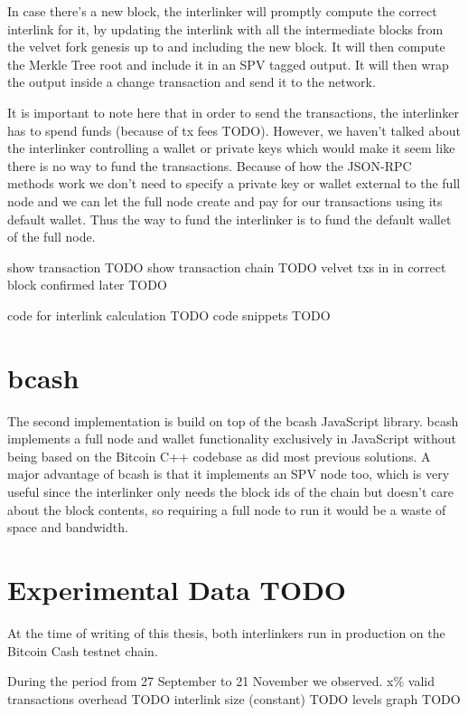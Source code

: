 In case there's a new block, the interlinker will promptly compute the correct interlink for it, by updating the interlink with all the intermediate blocks from the velvet fork genesis up to and including the new block. It will then compute the Merkle Tree root and include it in an SPV tagged output. It will then wrap the output inside a change transaction and send it to the network.

It is important to note here that in order to send the transactions, the interlinker has to spend funds (because of tx fees TODO). However, we haven't talked about the interlinker controlling a wallet or private keys which would make it seem like there is no way to fund the transactions. Because of how the JSON-RPC methods work we don't need to specify a private key or wallet external to the full node and we can let the full node create and pay for our transactions using its default wallet. Thus the way to fund the interlinker is to fund the default wallet of the full node.

show transaction TODO
show transaction chain TODO
velvet txs in in correct block confirmed later TODO

code for interlink calculation TODO
code snippets TODO

\section{bcash}
The second implementation is build on top of the bcash JavaScript library. bcash implements a full node and wallet functionality exclusively in JavaScript without being based on the Bitcoin C++ codebase as did most previous solutions. A major advantage of bcash is that it implements an SPV node too, which is very useful since the interlinker only needs the block ids of the chain but doesn't care about the block contents, so requiring a full node to run it would be a waste of space and bandwidth.

\section{Experimental Data TODO}
At the time of writing of this thesis, both interlinkers run in production on the Bitcoin Cash testnet chain.

During the period from 27 September to 21 November we observed.
x\% valid transactions
overhead TODO
interlink size (constant) TODO
levels graph TODO
